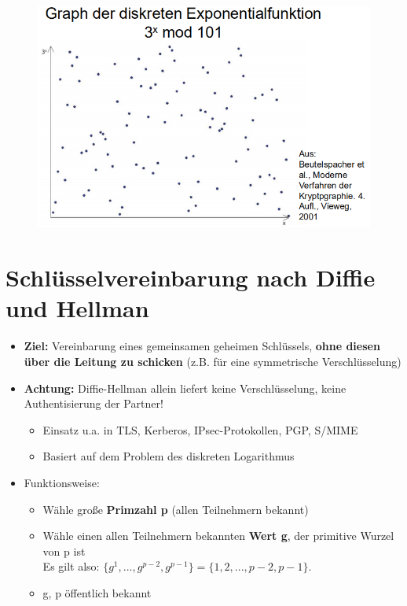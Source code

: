 \documentclass[openany]{book}
\begin{document}
\begin{figure}[h!]
    \centering
    \includegraphics[width=0.85\linewidth]{Pics/DiscreetLogarithmGraph.PNG}
\end{figure} 

\newpage

\section{Schlüsselvereinbarung nach Diffie und Hellman}

\begin{itemize}
    \item \textbf{Ziel:} Vereinbarung eines gemeinsamen geheimen Schlüssels, \textbf{ohne diesen über die Leitung zu schicken} (z.B. für eine symmetrische Verschlüsselung)
    \item \textbf{Achtung:} Diffie-Hellman allein liefert keine Verschlüsselung, keine Authentisierung der Partner!
    \begin{itemize}
        \item Einsatz u.a. in TLS, Kerberos, IPsec-Protokollen, PGP, S/MIME
        \item Basiert auf dem Problem des diskreten Logarithmus
    \end{itemize}
    \item Funktionsweise: 
    \begin{itemize}
        \item Wähle große \textbf{Primzahl p} (allen Teilnehmern bekannt)
        \item Wähle einen allen Teilnehmern bekannten \textbf{Wert g}, der primitive Wurzel von p ist \\ Es gilt also: $\{ g^1,...,g^{p-2},g^{p-1}\} = \{ 1,2,...,p-2,p-1\}$.
        \item g, p öffentlich bekannt
    \end{itemize}
\end{itemize}
\end{document}
